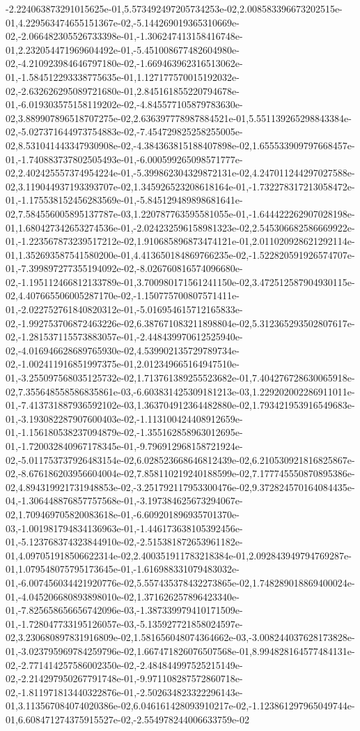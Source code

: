 -2.224063873291015625e-01,5.573492497205734253e-02,2.008583396673202515e-01,4.229563474655151367e-02,-5.144269019365310669e-02,-2.066482305526733398e-01,-1.306247413158416748e-01,2.232054471969604492e-01,-5.451008677482604980e-02,-4.210923984646797180e-02,-1.669463962316513062e-01,-1.584512293338775635e-01,1.127177570015192032e-02,-2.632626295089721680e-01,2.845161855220794678e-01,-6.019303575158119202e-02,-4.845577105879783630e-02,3.889907896518707275e-02,2.636397778987884521e-01,5.551139265298843384e-02,-5.027371644973754883e-02,-7.454729825258255005e-02,8.531041443347930908e-02,-4.384363815188407898e-02,1.655533909797668457e-01,-1.740883737802505493e-01,-6.000599265098571777e-02,2.402425557374954224e-01,-5.399862304329872131e-02,4.247011244297027588e-02,3.119044937193393707e-02,1.345926523208618164e-01,-1.732278317213058472e-01,-1.175538152456283569e-01,-5.845129489898681641e-02,7.584556005895137787e-03,1.220787763595581055e-01,-1.644422262907028198e-01,1.680427342653274536e-01,-2.024232596158981323e-02,2.545306682586669922e-01,-1.223567873239517212e-02,1.910685896873474121e-01,2.011020928621292114e-01,1.352693587541580200e-01,4.413650184869766235e-02,-1.522820591926574707e-01,-7.399897277355194092e-02,-8.026760816574096680e-02,-1.195112466812133789e-01,3.700980171561241150e-02,3.472512587904930115e-02,4.407665506005287170e-02,-1.150775700807571411e-01,-2.022752761840820312e-01,-5.016954615712165833e-02,-1.992753706872463226e-02,6.387671083211898804e-02,5.312365293502807617e-02,-1.281537115573883057e-01,-2.448439970612525940e-02,-4.016946628689765930e-02,4.539902135729789734e-02,-1.002411916851997375e-01,2.012349665164947510e-01,-3.255097568035125732e-02,1.713761389255523682e-01,7.404276728630065918e-02,7.355648558586835861e-03,-6.603831425309181213e-03,1.229202002286911011e-01,-7.413731887936592102e-03,1.363704912364482880e-02,1.793421953916549683e-01,-3.193082287907600403e-02,-1.113100424408912659e-01,-1.156180538237094879e-02,-1.355162858963012695e-01,-1.720032840967178345e-01,-9.796912968158721924e-02,-5.011753737926483154e-02,6.028523668646812439e-02,6.210530921816825867e-02,-8.676186203956604004e-02,7.858110219240188599e-02,7.177745550870895386e-02,4.894319921731948853e-02,-3.251792117953300476e-02,9.372824570164084435e-04,-1.306448876857757568e-01,-3.197384625673294067e-02,1.709469705820083618e-01,-6.609201896935701370e-03,-1.001981794834136963e-01,-1.446173638105392456e-01,-5.123768374323844910e-02,-2.515381872653961182e-01,4.097051918506622314e-02,2.400351911783218384e-01,2.092843949794769287e-01,1.079548075795173645e-01,-1.616988331079483032e-01,-6.007456034421920776e-02,5.557435378432273865e-02,1.748289018869400024e-01,-4.045206680893898010e-02,1.371626257896423340e-01,-7.825658656656742096e-03,-1.387339979410171509e-01,-1.728047733195126057e-03,-5.135927721858024597e-02,3.230680897831916809e-02,1.581656048074364662e-03,-3.008244037628173828e-01,-3.023795969784259796e-02,1.667471826076507568e-01,8.994828164577484131e-02,-2.771414257586002350e-02,-2.484844997525215149e-02,-2.214297950267791748e-01,-9.971108287572860718e-02,-1.811971813440322876e-01,-2.502634823322296143e-01,3.113567084074020386e-02,6.046161428093910217e-02,-1.123861297965049744e-01,6.608471274375915527e-02,-2.554978244006633759e-02
